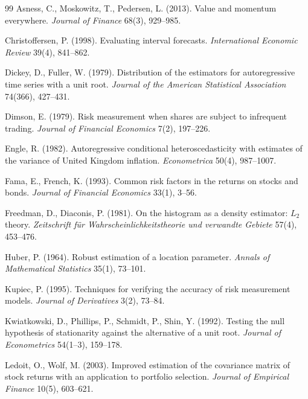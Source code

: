 \documentclass[11pt,a4paper]{article}
\begin{document}
\newpage
\begin{thebibliography}{99}
\small
{}
Asness, C., Moskowitz, T., Pedersen, L. (2013). Value and momentum everywhere.
\emph{Journal of Finance} 68(3), 929--985.

Christoffersen, P. (1998). Evaluating interval forecasts.
\emph{International Economic Review} 39(4), 841--862.

Dickey, D., Fuller, W. (1979). Distribution of the estimators for autoregressive time
series with a unit root. \emph{Journal of the American Statistical Association}
74(366), 427--431.

Dimson, E. (1979). Risk measurement when shares are subject to infrequent trading.
\emph{Journal of Financial Economics} 7(2), 197--226.

Engle, R. (1982). Autoregressive conditional heteroscedasticity with estimates of the
variance of United Kingdom inflation. \emph{Econometrica} 50(4), 987--1007.

Fama, E., French, K. (1993). Common risk factors in the returns on stocks and bonds.
\emph{Journal of Financial Economics} 33(1), 3--56.

Freedman, D., Diaconis, P. (1981). On the histogram as a density estimator: $L_2$
theory. \emph{Zeitschrift f\"ur Wahrscheinlichkeitstheorie und verwandte Gebiete}
57(4), 453--476.

Huber, P. (1964). Robust estimation of a location parameter.
\emph{Annals of Mathematical Statistics} 35(1), 73--101.

Kupiec, P. (1995). Techniques for verifying the accuracy of risk measurement models.
\emph{Journal of Derivatives} 3(2), 73--84.

Kwiatkowski, D., Phillips, P., Schmidt, P., Shin, Y. (1992). Testing the null
hypothesis of stationarity against the alternative of a unit root.
\emph{Journal of Econometrics} 54(1--3), 159--178.

Ledoit, O., Wolf, M. (2003). Improved estimation of the covariance matrix of stock
returns with an application to portfolio selection.
\emph{Journal of Empirical Finance} 10(5), 603--621.


\end{thebibliography}
\end{document}
